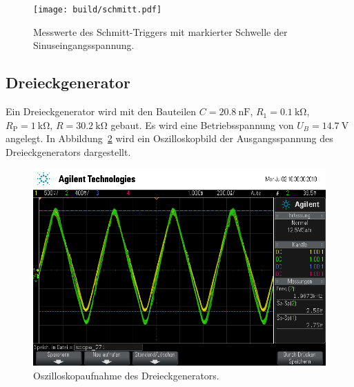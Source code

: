 \begin{figure}[ht]
  \centering
    \centering
    \texttt{[image: build/schmitt.pdf]}
    \caption{Messwerte des Schmitt-Triggers mit markierter Schwelle der Sinuseingangsspannung.}
    \label{fig:schmitt_plot}
  \label{fig:schmitt}
\end{figure}

\subsection{Dreieckgenerator}
Ein Dreieckgenerator wird mit den Bauteilen
$C = \SI{20.8}{\nano\farad}$,
$R_1 = \SI{0.1}{\kilo\ohm}$,
$R_\text{P} = \SI{1}{\kilo\ohm}$,
$R = \SI{30.2}{\kilo\ohm}$
gebaut.
Es wird eine Betriebsspannung von $U_B = \SI{14.7}{\volt}$ angelegt.
In Abbildung~\ref{fig:dreieck_generator} wird ein Oszilloskopbild
der Ausgangsspannung des Dreieckgenerators dargestellt.
\begin{figure}[ht]
  \centering
  \includegraphics[height=0.3\textheight]{data/scope_271.png}
  \caption{Oszilloskopaufnahme des Dreieckgenerators.}
  \label{fig:dreieck_generator}
\end{figure}

